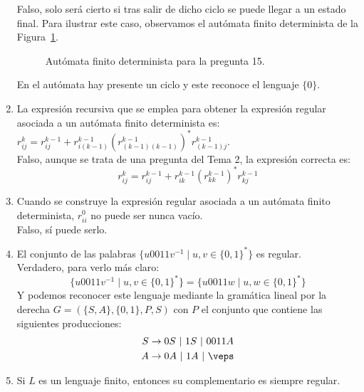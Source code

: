\begin{enumerate}
        Falso, solo será cierto si tras salir de dicho ciclo se puede llegar a un estado final. Para ilustrar este caso, observamos el autómata finito determinista de la Figura~\ref{fig:tipo_test15}.
        \begin{figure}[H]
           \centering
           \caption{Autómata finito determinista para la pregunta 15.}
           \label{fig:tipo_test15}
       \end{figure}
       En el autómata hay presente un ciclo y este reconoce el lenguaje $\{0\}$.
    \item La expresión recursiva que se emplea para obtener la expresión regular asociada a un autómata finito determinista es: $r^k_{ij} = r^{k-1}_{ij} + r^{k-1}_{i(k-1)}{(r^{k-1}_{(k-1)(k-1)})}^{\ast}r^{k-1}_{(k-1)j}$.\\

        Falso, aunque se trata de una pregunta del Tema 2, la expresión correcta es:
        \begin{equation*}
            r_{ij}^k = r_{ij}^{k-1} + r_{ik}^{k-1}{(r_{kk}^{k-1})}^{\ast}r_{kj}^{k-1}
        \end{equation*}
    \item Cuando se construye la expresión regular asociada a un autómata finito determinista, $r^0_{ii}$ no puede ser nunca vacío.\\

        Falso, sí puede serlo.
    \item El conjunto de las palabras $\{u0011v^{-1} \mid u,v\in {\{0,1\}}^{\ast}\}$ es regular.\\

        Verdadero, para verlo más claro:
        \begin{equation*}
            \{u0011v^{-1}\mid u,v\in {\{0,1\}}^{\ast}\} = \{u0011w \mid u,w\in {\{0,1\}}^{\ast}\}
        \end{equation*}
        Y podemos reconocer este lenguaje mediante la gramática lineal por la derecha $G=(\{S,A\},\{0,1\},P,S)$ con $P$ el conjunto que contiene las siguientes producciones:
        \begin{align*}
            S &\rightarrow 0S\ |\ 1S\ |\ 0011A \\
            A &\rightarrow 0A\ |\ 1A\ |\ \veps
        \end{align*}
    \item Si $L$ es un lenguaje finito, entonces su complementario es siempre regular.\\


\end{enumerate}
